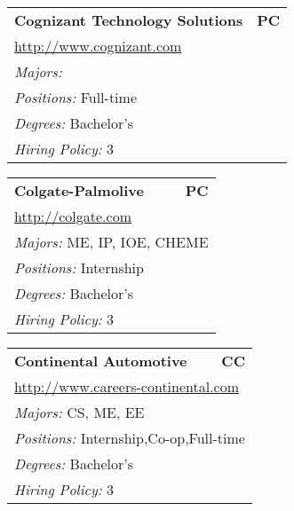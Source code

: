 \documentclass[twoside]{article}
\begin{document}
\begin{center}
\begin{multicols}{3}
\begin{FlushLeft}
\begin{minipage}{.9\columnwidth}
\end{minipage}
 
\begin{minipage}{.9\columnwidth}\begin{tabularx}{.95\columnwidth}{Xr}
                 {\Large\bf Cognizant Technology Solutions} & {\Large\bf PC}\\
    \multicolumn{2}{p{.95\columnwidth}}{\url{http://www.cognizant.com}}\\
    \multicolumn{2}{p{.95\columnwidth}}{\emph{Majors:} }\\
    \multicolumn{2}{p{.95\columnwidth}}{\emph{Positions:} Full-time}\\
    \multicolumn{2}{p{.95\columnwidth}}{\emph{Degrees:} Bachelor's}\\
    \multicolumn{2}{p{.95\columnwidth}}{\emph{Hiring Policy:} 3}\\
    \end{tabularx}
    
\end{minipage}
 
\begin{minipage}{.9\columnwidth}\begin{tabularx}{.95\columnwidth}{Xr}
                 {\Large\bf Colgate-Palmolive} & {\Large\bf PC}\\
    \multicolumn{2}{p{.95\columnwidth}}{\url{http://colgate.com}}\\
    \multicolumn{2}{p{.95\columnwidth}}{\emph{Majors:} ME, IP, IOE, CHEME}\\
    \multicolumn{2}{p{.95\columnwidth}}{\emph{Positions:} Internship}\\
    \multicolumn{2}{p{.95\columnwidth}}{\emph{Degrees:} Bachelor's}\\
    \multicolumn{2}{p{.95\columnwidth}}{\emph{Hiring Policy:} 3}\\
    \end{tabularx}
    
\end{minipage}
 
\begin{minipage}{.9\columnwidth}\begin{tabularx}{.95\columnwidth}{Xr}
                 {\Large\bf Continental Automotive} & {\Large\bf CC}\\
    \multicolumn{2}{p{.95\columnwidth}}{\url{http://www.careers-continental.com}}\\
    \multicolumn{2}{p{.95\columnwidth}}{\emph{Majors:} CS, ME, EE}\\
    \multicolumn{2}{p{.95\columnwidth}}{\emph{Positions:} Internship,Co-op,Full-time}\\
    \multicolumn{2}{p{.95\columnwidth}}{\emph{Degrees:} Bachelor's}\\
    \multicolumn{2}{p{.95\columnwidth}}{\emph{Hiring Policy:} 3}\\
    \end{tabularx}
    

\end{minipage}
\end{FlushLeft}
\end{multicols}
\end{center}
\end{document}

